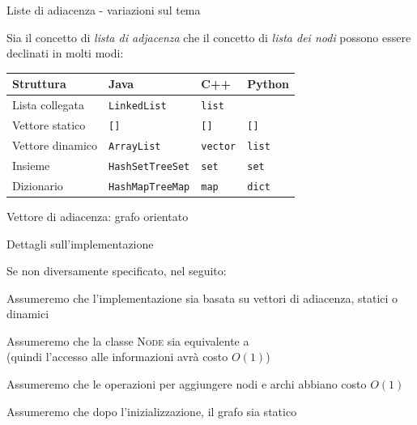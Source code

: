 \begin{frame}{Liste di adiacenza - variazioni sul tema}

Sia il concetto di \emph{lista di adjacenza} che il concetto di \emph{lista dei nodi} possono essere declinati in molti modi:

\bigskip
\centering
\begin{tabular}{|P{3cm}|P{2cm}|P{2cm}|P{2cm}|}
\hline
\textbf{Struttura} & \textbf{Java} &\textbf{C++}& \textbf{Python} \\\hline
Lista collegata & \texttt{LinkedList} & \texttt{list} & \\\hline
Vettore statico & \texttt{[]} & \texttt{[]} & \texttt{[]} \\\hline
Vettore dinamico & \texttt{ArrayList} & \texttt{vector} & \texttt{list} \\\hline
Insieme & \texttt{HashSet}\newline\texttt{TreeSet} & \texttt{set} & \texttt{set} \\\hline
Dizionario & \texttt{HashMap}\newline \texttt{TreeMap} & \texttt{map} & \texttt{dict} \\\hline
\end{tabular}

\end{frame}




\begin{frame}{Vettore di adiacenza: grafo orientato}

\end{frame}


\begin{frame}{Dettagli sull'implementazione}

Se non diversamente specificato, nel seguito:
\BIL
\item Assumeremo che l'implementazione sia basata su vettori di adiacenza,
statici o dinamici
\item Assumeremo che la classe \textsc{Node} sia equivalente a \INTEGER \\
(quindi l'accesso alle informazioni avrà costo $O(1)$)
\item Assumeremo che le operazioni per aggiungere nodi e archi abbiano costo $O(1)$
\item Assumeremo che dopo l'inizializzazione, il grafo sia statico
\EIL

\end{frame}

